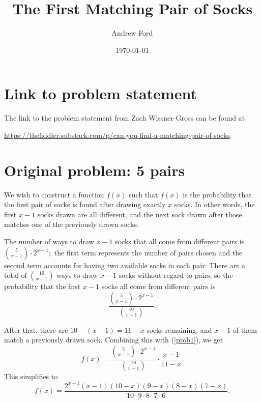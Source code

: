 \documentclass{article}
\title{The First Matching Pair of Socks}
\author{Andrew Ford}
\date{\today}
\begin{document}
\maketitle

\section{Link to problem statement}

The link to the problem statement from Zach Wissner-Gross can be found at

\href{https://thefiddler.substack.com/p/can-you-find-a-matching-pair-of-socks}{https://thefiddler.substack.com/p/can-you-find-a-matching-pair-of-socks}.

\section{Original problem: 5 pairs}

We wish to construct a function $f(x)$ such that $f(x)$ is the probability that the first pair of socks is found after drawing exactly $x$ socks. In other words, the first $x-1$ socks drawn are all different, and the next sock drawn after those matches one of the previously drawn socks.

The number of ways to draw $x-1$ socks that all come from different pairs is
${5 \choose {x-1}} \cdot 2^{x-1};$
the first term represents the number of pairs chosen and the second term accounts for having two available socks in each pair. There are a total of ${{10} \choose {x-1}}$ ways to draw $x-1$ socks without regard to pairs, so the probability that the first $x-1$ socks all come from different pairs is
\begin{equation}\label{prob1}
\frac{{5 \choose {x-1}} \cdot 2^{x-1}}{{{10} \choose {x-1}}}.
\end{equation}

After that, there are $10-(x-1) = 11-x$ socks remaining, and $x-1$ of them match a previously drawn sock. Combining this with (\ref{prob1}), we get
\begin{equation}\label{fxexp}
f(x) = \frac{{5 \choose {x-1}} \cdot 2^{x-1}}{{{10} \choose {x-1}}} \cdot \frac{x-1}{11-x}.
\end{equation}
This simplifies to
\begin{equation}\label{fxsimple}
f(x) = \frac{2^{x-1} (x-1) (10-x) (9-x) (8-x) (7-x)}{10 \cdot 9 \cdot 8 \cdot 7 \cdot 6}.
\end{equation}
\end{document}

